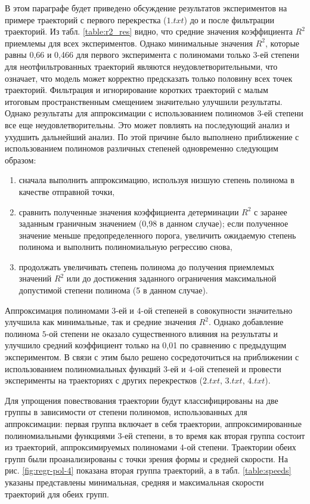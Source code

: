 В этом параграфе будет приведено обсуждение результатов экспериментов на примере траекторий с первого перекрестка ($ 1.txt $) до и после фильтрации траекторий. Из табл. \ref{table:r2_res} видно, что средние значения коэффициента $R^2$ приемлемы для всех экспериментов. Однако минимальные значения $R^2$, которые равны 0,66 и 0,466 для первого эксперимента с полиномами только $3$-ей степени для неотфильтрованных траекторий являются неудовлетворительными, что означает, что модель может корректно предсказать только половину всех точек траекторий. Фильтрация и игнорирование коротких траекторий с малым итоговым пространственным смещением значительно улучшили результаты. Однако результаты для аппроксимации с использованием полиномов $3$-ей степени все еще неудовлетворительны. Это может повлиять на последующий анализ и ухудшить дальнейший анализ. По этой причине было выполнено приближение с использованием полиномов различных степеней одновременно следующим образом:

\begin{enumerate}
	\setlength\itemsep{-0.5em}
	\item сначала выполнить аппроксимацию, используя низшую степень полинома в качестве отправной точки,
	\item сравнить полученные значения коэффициента детерминации $R^2$ с заранее заданным граничным значением (0,98 в данном случае); если полученное значение меньше предопределенного порога, увеличить ожидаемую степень полинома и выполнить полиномиальную регрессию снова,
	\item продолжать увеличивать степень полинома до получения приемлемых значений $R^2$ или до достижения заданного ограничения максимальной допустимой степени полинома (5 в данном случае). 
\end{enumerate} 

Аппроксимация полиномами $3$-ей и $4$-ой степеней в совокупности значительно улучшила как минимальные, так и средние значения $R^2$. Однако добавление полинома $5$-ой степени не оказало существенного влияния на результаты и улучшило средний коэффициент только на 0,01 по сравнению с предыдущим экспериментом. В связи с этим было решено сосредоточиться на приближении с использованием полиномиальных функций $3$-ей и $4$-ой степеней и провести эксперименты на траекториях с других перекрестков ($2.txt$, $3.txt$, $4.txt$).

Для упрощения повествования траектории будут классифицированы на две группы в зависимости от степени полиномов, использованных для аппроксимации: первая группа включает в себя траектории, аппроксимированные полиномиальными функциями $3$-ей степени, в то время как вторая группа состоит из траекторий, аппроксимируемых полиномами $4$-ой степени. Траектории обеих групп были проанализированы с точки зрения формы и средней скорости. На рис. \ref{fig:regr-pol-4} показана вторая группа траекторий, а в табл. \ref{table:speeds} указаны представлены минимальная, средняя и максимальная скорости траекторий для обеих групп.

